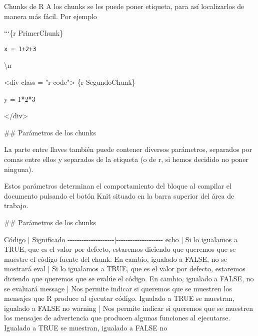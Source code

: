 \documentclass[
  ignorenonframetext,
]{beamer}
\newenvironment{Shaded}{\begin{snugshade}}{\end{snugshade}}
\newcommand{\NormalTok}[1]{#1}
\begin{document}
\begin{frame}[fragile]{Chunks de R}
\label{chunks-de-r-2}
A los chunks se les puede poner etiqueta, para así localizarlos de
manera más fácil. Por ejemplo

```\{r PrimerChunk\}

\texttt{x\ =\ 1+2+3}

\begin{Shaded}
\begin{Highlighting}[]

\NormalTok{\textbackslash{}n}


\NormalTok{\textless{}div class = "r{-}code"\textgreater{}}
\NormalTok{\textasciigrave{}\textasciigrave{}\textasciigrave{}\{r SegundoChunk\}}

\NormalTok{\textasciigrave{} y = 1*2*3\textasciigrave{}}

\NormalTok{\textasciigrave{}\textasciigrave{}\textasciigrave{}\textless{}/div\textgreater{}}




\NormalTok{\#\# Parámetros de los chunks}

\NormalTok{La parte entre llaves también puede contener diversos parámetros, separados por comas entre ellos y separados de la etiqueta (o de r, si hemos decidido no poner ninguna).}

\NormalTok{Estos parámetros determinan el comportamiento del bloque al compilar el documento pulsando el botón \textasciigrave{}Knit\textasciigrave{} situado en la barra superior del área de trabajo.}

\NormalTok{\#\# Parámetros de los chunks}

\NormalTok{Código |  Significado                                  }
\NormalTok{{-}{-}{-}{-}{-}{-}{-}{-}{-}{-}{-}{-}{-}{-}{-}{-}{-}{-}{-}{-}|{-}{-}{-}{-}{-}{-}{-}{-}{-}{-}{-}{-}{-}{-}{-}{-}{-}{-}{-}{-}}
\NormalTok{\textasciigrave{}echo\textasciigrave{} | Si lo igualamos a \textasciigrave{}TRUE\textasciigrave{}, que es el valor por defecto, estaremos diciendo que queremos que se muestre el código fuente del chunk. En cambio, igualado a \textasciigrave{}FALSE\textasciigrave{}, no se mostrará}
\NormalTok{\textasciigrave{}eval\textasciigrave{} | Si lo igualamos a \textasciigrave{}TRUE\textasciigrave{}, que es el valor por defecto, estaremos diciendo que queremos que se evalúe el código. En cambio, igualado a \textasciigrave{}FALSE\textasciigrave{}, no se evaluará}
\NormalTok{\textasciigrave{}message\textasciigrave{} | Nos permite indicar si queremos que se muestren los mensajes que R produce al ejecutar código. Igualado a \textasciigrave{}TRUE\textasciigrave{} se muestran, igualado a \textasciigrave{}FALSE\textasciigrave{} no}
\NormalTok{\textasciigrave{}warning\textasciigrave{} | Nos permite indicar si queremos que se muestren los mensajes de advertencia que producen algunas funciones al ejecutarse. Igualado a \textasciigrave{}TRUE\textasciigrave{} se muestran, igualado a \textasciigrave{}FALSE\textasciigrave{} no}


\end{Highlighting}
\end{Shaded}
\end{frame}
\end{document}
